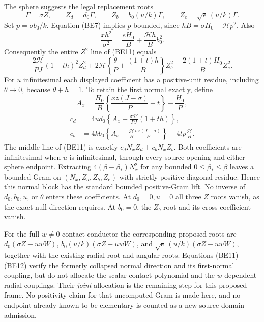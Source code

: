 The sphere suggests the legal replacement roots
\[
 \Gamma=\sigma Z,\qquad Z_d=d_0\Gamma,\qquad
 Z_b=b_0(u/k)\Gamma,\qquad Z_e=\sqrt e\,(u/k)\Gamma.
\]
Set $p=\sigma b_0/k$. Equation (BE7) implies $p$ bounded, since
$hB=\sigma H_0+\mathcal H p^2$. Also
\[
 \frac{xh^2}{\sigma^2}
   =\frac{eH_0}{B}+\frac{\mathcal Hh}{B}b_0^2.
\]
Consequently the entire $Z^2$ line of (BE11) equals
\[
 \frac{2\mathcal H}{PJ}(1+th)^2Z_d^2
 +2\mathcal H\left\{\frac\theta P+\frac{(1+t)h}{B}\right\}Z_b^2
 +\frac{2(1+t)H_0}{B}Z_e^2.                       \tag{BE12}
\]
For $u$ infinitesimal each displayed coefficient has a positive-unit
residue, including $\theta\to0$, because $\theta+h=1$.
To retain the first normal exactly, define
\[
 A_x=\frac{H_0}{B}\left\{\frac{xz(J-\sigma)}P-t\right\}
       -\frac{H_0}P,
\]
\begin{align*}
 c_d&=4ud_0\left\{A_x-\frac{\sigma\mathcal H}{PJ}(1+th)\right\},\\
 c_b&=4kb_0\left\{A_x+\frac{\mathcal H}{B}
                       \frac{\sigma z(J-\sigma)}P\right\}
                      -4tp\frac{\mathcal H}{B}.
\end{align*}
The middle line of (BE11) is exactly
$c_dN_xZ_d+c_bN_xZ_b$. Both coefficients are infinitesimal when
$u$ is infinitesimal, through every source opening and either sphere
endpoint. Extracting $4(\beta-\beta_*)N_x^2$ for any bounded
$0\le\beta_*\le\beta$ leaves a bounded Gram on
$(N_x,Z_d,Z_b,Z_e)$ with strictly positive diagonal residue. Hence
this normal block has the standard bounded positive-Gram lift.
No inverse of $d_0,b_0,u$, or $\theta$ enters these coefficients.
At $d_0=0,u=0$ all three $Z$ roots vanish, as the exact null direction
requires. At $b_0=0$, the $Z_b$ root and its cross coefficient vanish.

For the full $w\ne0$ contact conductor the corresponding proposed
roots are $d_0(\sigma Z-uwW)$,
$b_0(u/k)(\sigma Z-uwW)$, and
$\sqrt e\,(u/k)(\sigma Z-uwW)$, together with the existing radial
root and angular roots. Equations (BE11)--(BE12) verify the formerly
collapsed normal direction and its first-normal coupling, but do not
allocate the scalar contact polynomial and the $w$-dependent radial
couplings. Their \emph{joint} allocation is the remaining step for
this proposed frame. No positivity claim for that uncomputed Gram is
made here, and no endpoint already known to be elementary is counted
as a new source-domain admission.
